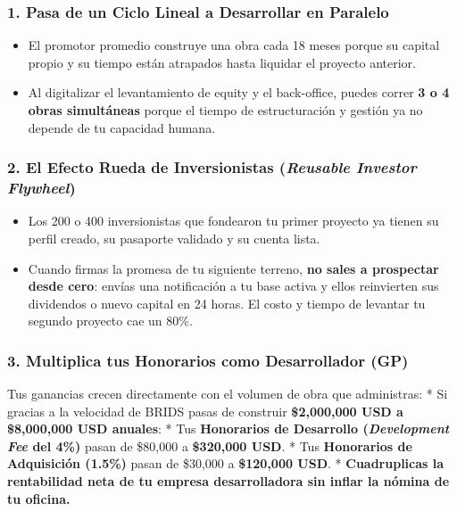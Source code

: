 \documentclass[
]{article}
\providecommand{\tightlist}{%
  \setlength{\itemsep}{0pt}\setlength{\parskip}{0pt}}
\begin{document}
\subsubsection{1. Pasa de un Ciclo Lineal a Desarrollar en
Paralelo}\label{pasa-de-un-ciclo-lineal-a-desarrollar-en-paralelo}

\begin{itemize}
\tightlist
\item
  El promotor promedio construye una obra cada 18 meses porque su
  capital propio y su tiempo están atrapados hasta liquidar el proyecto
  anterior.
\item
  Al digitalizar el levantamiento de equity y el back-office, puedes
  correr \textbf{3 o 4 obras simultáneas} porque el tiempo de
  estructuración y gestión ya no depende de tu capacidad humana.
\end{itemize}

\subsubsection{\texorpdfstring{2. El Efecto Rueda de Inversionistas
(\emph{Reusable Investor
Flywheel})}{2. El Efecto Rueda de Inversionistas (Reusable Investor Flywheel)}}\label{el-efecto-rueda-de-inversionistas-reusable-investor-flywheel}

\begin{itemize}
\tightlist
\item
  Los 200 o 400 inversionistas que fondearon tu primer proyecto ya
  tienen su perfil creado, su pasaporte validado y su cuenta lista.
\item
  Cuando firmas la promesa de tu siguiente terreno, \textbf{no sales a
  prospectar desde cero}: envías una notificación a tu base activa y
  ellos reinvierten sus dividendos o nuevo capital en 24 horas. El costo
  y tiempo de levantar tu segundo proyecto cae un 80\%.
\end{itemize}

\subsubsection{3. Multiplica tus Honorarios como Desarrollador
(GP)}\label{multiplica-tus-honorarios-como-desarrollador-gp}

Tus ganancias crecen directamente con el volumen de obra que
administras: * Si gracias a la velocidad de BRIDS pasas de construir
\textbf{\$2,000,000 USD a \$8,000,000 USD anuales}: * Tus
\textbf{Honorarios de Desarrollo (\emph{Development Fee} del 4\%)} pasan
de \$80,000 a \textbf{\$320,000 USD}. * Tus \textbf{Honorarios de
Adquisición (1.5\%)} pasan de \$30,000 a \textbf{\$120,000 USD}. *
\textbf{Cuadruplicas la rentabilidad neta de tu empresa desarrolladora
sin inflar la nómina de tu oficina.}
\end{document}
